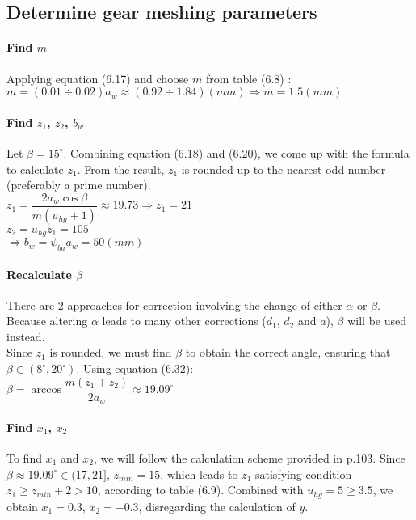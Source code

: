 \subsection{Determine gear meshing parameters}
\paragraph{Find $ m $} Applying equation (6.17)  and choose $ m $ from table (6.8) :\\
$ m = (0.01\div0.02)a_w \approx (0.92\div1.84) \unit{(mm)} \Rightarrow m=1.5\unit{(mm)}$
\paragraph{Find $ z_1 $, $ z_2 $, $ b_w $} Let $ \beta = 15^\circ $. Combining equation (6.18) and (6.20), we come up with the formula to calculate $ z_1 $. From the result, $ z_1 $ is rounded up to the nearest odd number (preferably a prime number).\\
$ z_1 = \dfrac{2a_w\cos\beta}{m(u_{hg}+1)} \approx 19.73 \Rightarrow z_1 = 21$\\
$ z_2 = u_{hg}z_1 = 105 $\\
$ \Rightarrow b_w = \psi_{ba}a_w = 50\unit{(mm)}$ 

\paragraph{Recalculate $ \beta $} There are 2 approaches for correction involving the change of either $ \alpha $ or $ \beta $. Because altering $ \alpha $ leads to many other corrections ($ d_1 $, $ d_2 $ and $ a $), $ \beta $ will be used instead.\\
Since $ z_1 $ is rounded, we must find $ \beta $ to obtain the correct angle, ensuring that $ \beta \in (8^\circ, 20^\circ) $. Using equation (6.32):\\
$ \beta = \arccos\dfrac{m(z_1+z_2)}{2a_w} \approx 19.09^\circ$

\paragraph{Find $ x_1 $, $ x_2 $} To find $ x_1 $ and $ x_2 $, we will follow the calculation scheme provided in p.103. Since $ \beta \approx 19.09^\circ \in (17,21]$, $ z_{min} = 15$, which leads to $ z_1 $ satisfying condition $ z_1 \geq z_{min} + 2 > 10 $, according to table (6.9). Combined with $ u_{hg} = 5 \geq 3.5 $, we obtain $ x_1 = 0.3 $, $ x_2 = -0.3 $, disregarding the calculation of $ y $.

